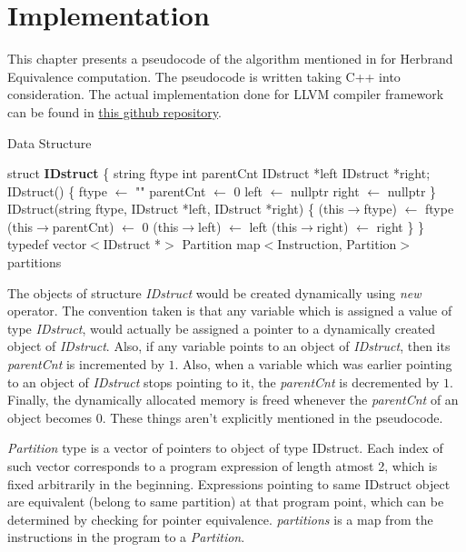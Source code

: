 \chapter{Implementation}
\label{chap:chapter7}

This chapter presents a pseudocode of the algorithm mentioned in 
\cite{Babu} for Herbrand Equivalence computation. The pseudocode is 
written taking C++ into consideration. The actual implementation done 
for LLVM compiler framework can be found in 
\href{https://github.com/himanshu520/HerbrandEquivalence}{this github repository}.

\begin{algorithm}
\caption{Data Structure}\label{DataStructure}
\begin{algorithmic}[1]
\State struct \textbf{IDstruct} \{
    \State\;\;\; string ftype
    \State\;\;\; int parentCnt
    \State\;\;\; IDstruct *left
    \State\;\;\; IDstruct *right;
    \State
    \State\;\;\; IDstruct() \{
        \State\;\;\;\;\;\; ftype $\gets$ ""
        \State\;\;\;\;\;\; parentCnt $\gets$ 0
        \State\;\;\;\;\;\; left $\gets$ nullptr
        \State\;\;\;\;\;\; right $\gets$ nullptr
    \State\;\;\; \}
    \State
    \State\;\;\; IDstruct(string ftype, IDstruct *left, IDstruct *right) \{
        \State\;\;\;\;\;\; (this$\rightarrow$ftype) $\gets$ ftype
        \State\;\;\;\;\;\; (this$\rightarrow$parentCnt) $\gets$ 0
        \State\;\;\;\;\;\; (this$\rightarrow$left) $\gets$ left
        \State\;\;\;\;\;\; (this$\rightarrow$right) $\gets$ right
    \State\;\;\; \}
\State \}
\State typedef vector$<$IDstruct *$>$ Partition
\State map$<$Instruction, Partition$>$ partitions
\end{algorithmic}
\end{algorithm}

The objects of structure \textit{IDstruct} would be created dynamically using \textit{new} operator. The convention taken is that any variable which is assigned a value of type \textit{IDstruct}, would actually be assigned a pointer to a dynamically created object of \textit{IDstruct}. Also, if any variable points to an object of \textit{IDstruct}, then its \textit{parentCnt} is incremented by $1$. Also, when a variable which was earlier pointing to an object of \textit{IDstruct} stops pointing to it, the \textit{parentCnt} is decremented by $1$. Finally, the dynamically allocated memory is freed whenever the \textit{parentCnt} of an object becomes $0$. These things aren't explicitly mentioned in the pseudocode.

\textit{Partition} type is a vector of pointers to object of type IDstruct. Each index of such vector corresponds to a program expression of length atmost 2, which is fixed arbitrarily in the beginning. Expressions pointing to same IDstruct object are equivalent (belong to same partition) at that program point, which can be determined by checking for pointer equivalence. 
\textit{partitions} is a map from the instructions in the program to a \textit{Partition}.

